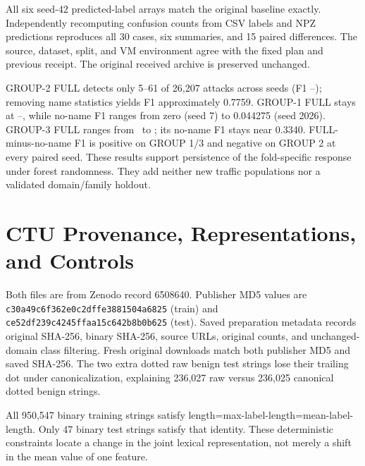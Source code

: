 \documentclass[conference]{IEEEtran}
\newcommand{\code}[1]{\texttt{#1}}
\begin{document}
All six seed-42 predicted-label arrays match the original baseline exactly. Independently recomputing confusion counts from CSV labels and NPZ predictions reproduces all 30 cases, six summaries, and 15 paired differences. The source, dataset, split, and VM environment agree with the fixed plan and previous receipt. The original received archive is preserved unchanged.

GROUP-2 FULL detects only 5--61 of 26,207 attacks across seeds (F1 \SeedTwoFullMin--\SeedTwoFullMax); removing name statistics yields F1 approximately 0.7759. GROUP-1 FULL stays at \SeedOneFullMin--\SeedOneFullMax, while no-name F1 ranges from zero (seed 7) to 0.044275 (seed 2026). GROUP-3 FULL ranges from \SeedThreeFullMin\ to \SeedThreeFullMax; its no-name F1 stays near 0.3340. FULL-minus-no-name F1 is positive on GROUP 1/3 and negative on GROUP 2 at every paired seed. These results support persistence of the fold-specific response under forest randomness. They add neither new traffic populations nor a validated domain/family holdout.

\FloatBarrier
\section{CTU Provenance, Representations, and Controls}
\begin{table}[!htbp]
\caption{Binary CTU structure after trim/lowercase/trailing-root-dot canonicalization. Class 1 here means the retained tunnel label, remapped from original multiclass label 2.}

\end{table}
\begin{table}[!htbp]
\caption{Original multiclass raw-string counts, before binary filtering or canonicalization. Original labels 0/1/2 denote benign/DGA/tunnel. The last column checks dots surviving a first-45-character truncation.}

\end{table}
Both files are from Zenodo record 6508640. Publisher MD5 values are \code{c30a49c6f362e0c2dffe3881504a6825} (train) and \code{ce52df239c4245ffaa15c642b8b0b625} (test). Saved preparation metadata records original SHA-256, binary SHA-256, source URLs, original counts, and unchanged-domain class filtering. Fresh original downloads match both publisher MD5 and saved SHA-256. The two extra dotted raw benign test strings lose their trailing dot under canonicalization, explaining 236,027 raw versus 236,025 canonical dotted benign strings.

All 950,547 binary training strings satisfy length=max-label-length=mean-label-length. Only 47 binary test strings satisfy that identity. These deterministic constraints locate a change in the joint lexical representation, not merely a shift in the mean value of one feature.
\end{document}
